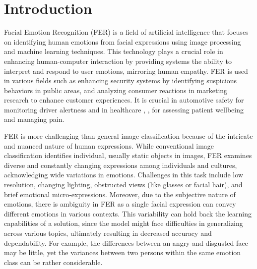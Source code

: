 \section{Introduction}
Facial Emotion Recognition (FER) is a field of artificial intelligence that focuses on identifying human emotions from facial expressions using image processing and machine learning techniques. This technology plays a crucial role in enhancing human-computer interaction by providing systems the ability to interpret and respond to user emotions, mirroring human empathy. FER is used in various fields such as enhancing security systems by identifying suspicious behaviors in public areas, and analyzing consumer reactions in marketing research to enhance customer experiences. It is crucial in automotive safety for monitoring driver alertness and in healthcare \cite{8535710}, \cite{onyema2021enhancement}, \cite{info11030128} for assessing patient wellbeing and managing pain.

FER is more challenging than general image classification because of the intricate and nuanced nature of human expressions. While conventional image classification identifies individual, usually static objects in images, FER examines diverse and constantly changing expressions among individuals and cultures, acknowledging wide variations in emotions. Challenges in this task include low resolution, changing lighting, obstructed views (like glasses or facial hair), and brief emotional micro-expressions. Moreover, due to the subjective nature of emotions, there is ambiguity in FER as a single facial expression can convey different emotions in various contexts. This variability can hold back the learning capabilities of a solution, since the model might face difficulties in generalizing across various topics, ultimately resulting in decreased accuracy and dependability. For example, the differences between an angry and disgusted face may be little, yet the variances between two persons within the same emotion class can be rather considerable.

